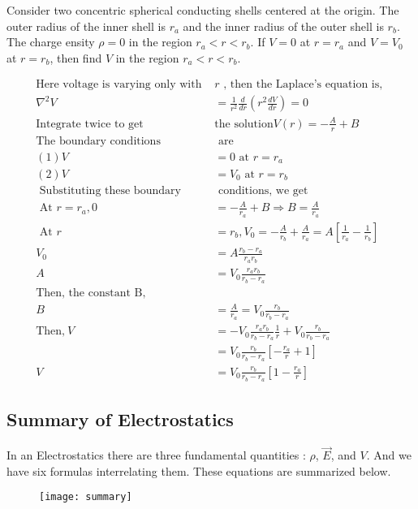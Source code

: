 \begin{exercise}
	Consider two concentric spherical conducting shells centered at the origin. The outer
	radius of the inner shell is $r_{a}$ and the inner radius of the outer shell is $r_{b}$. The charge ensity
	$\rho=0$ in the region $r_{a}<r<r_{b} .$ If $V=0$ at $r=r_{a}$ and $V=V_{0}$ at $r=r_{b}$, then find $V$ in the
	region $r_{a}<r<r_{b}$.
\end{exercise}
\begin{answer}
	\begin{align*}
	\text {Here voltage is varying only with }& r \text { , then the  Laplace's equation is, }\\
	\nabla^{2} V&=\frac{1}{r^{2}} \frac{d}{d r}\left(r^{2} \frac{d V}{d r}\right)=0\\
	\text{Integrate twice to get  }&\text{the solution}V(r)=- \frac{A}{r}+B\\
	\text{The boundary conditions}&\text{ are}\\
	(1) V&=0 \text{ at } r=r_{a}\\
	(2) V&=V_{0} \text{ at  }r=r_{b}\\
	\text { Substituting these boundary }&\text{ conditions, we get}\\
	\text { At } r=r_{a}, 0&=- \frac{A}{r_{a}}+B \Rightarrow B= \frac{A}{r_{a}}\\
	\text { At } r&=r_{b}, V_{0}=- \frac{A}{r_{b}}+ \frac{A}{r_{a}}=A\left[ \frac{1}{r_{a}}- \frac{1}{r_{b}}\right]\\
	V_{0}&=A \frac{r_{b}-r_{a}}{r_{a} r_{b}}\\
	A&= V_{0}\frac{r_{a} r_{b}}{r_{b}-r_{a}}\\
	\text{Then, the constant B,}\\
	B&=\frac{A}{r_{a}}=V_{0}\frac{ r_{b}}{r_{b}-r_{a}}\\
	\text{Then,}\ V&=-  V_{0}\frac{r_{a} r_{b}}{r_{b}-r_{a}}\frac{1}{r}+V_{0}\frac{ r_{b}}{r_{b}-r_{a}}\\
	&=V_{0}\frac{ r_{b}}{r_{b}-r_{a}}\left[- \frac{r_{a}}{r}+1\right]\\
	V&=V_{0}\frac{ r_{b}}{r_{b}-r_{a}}\left[1- \frac{r_{a}}{r}\right] 
	\end{align*}
\end{answer}
\subsection{Summary of Electrostatics}
In an Electrostatics  there are  three fundamental quantities : $\rho$, $\vec{E}$, and $V$. And we have six formulas interrelating them. These equations are  summarized below.
\begin{figure}[H]
	\begin{center}
		\texttt{[image: summary]}
	\end{center}
\end{figure}
